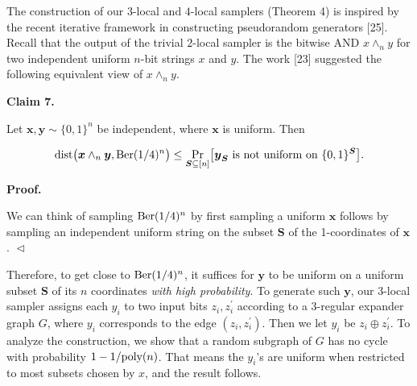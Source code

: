 \documentclass[10pt,a4paper]{article}
\begin{document}
The construction of our $3$-local and $4$-local samplers (Theorem 4) is inspired by the recent iterative framework in constructing pseudorandom generators [25].
Recall that the output of the trivial $2$-local sampler is the bitwise AND $x\wedge_{n}y$ for two independent uniform $n$-bit strings $x$ and $y$.
The work [23] suggested the following equivalent view of $x\wedge_{n}y$.\par





\par\medskip\noindent\textbf{
Claim 7. 
}\par



Let $\boldsymbol{x},\boldsymbol{y}\sim\{0,1\}^{n}$ be independent, where $\boldsymbol{x}$ is uniform.
Then\par


\[\begin{gathered}
\mathrm{dist}\bigl(\boldsymbol{x}\wedge_{n}\boldsymbol{y},\textnormal{Ber}(1/4)^{n}\bigr)\leq\Pr_{\boldsymbol{S}\subseteq[n]}\bigl[\text{$\boldsymbol{y}_{\boldsymbol{S}}$ is not uniform on $\{0,1\}^{\boldsymbol{S}}$}\bigr].
\end{gathered}\]






\par\medskip\noindent\textbf{
\textbf{Proof}.}\par




We can think of sampling $\textnormal{Ber}(1/4)^{n}$ by first sampling a uniform $\boldsymbol{x}$ follows by sampling an independent uniform string on the subset $\boldsymbol{S}$ of the 1-coordinates of $\boldsymbol{x}$.
$\vartriangleleft$\par




Therefore, to get close to $\textnormal{Ber}(1/4)^{n}$, it suffices for $\boldsymbol{y}$ to be uniform on a uniform subset $\boldsymbol{S}$ of its $n$ coordinates \emph{with high probability}.
To generate such $\boldsymbol{y}$, our 3-local sampler assigns each $y_{i}$ to two input bits $z_{i},z_{i}^{\prime}$ according to a 3-regular expander graph $G$, where $y_{i}$ corresponds to the edge $(z_{i},z_{i}^{\prime})$.
Then we let $y_{i}$ be $z_{i}\oplus z_{i}^{\prime}$.
To analyze the construction, we show that a random subgraph of $G$ has no cycle with probability $1-1/\textnormal{poly}(n)$.
That means the $y_{i}$’s are uniform when restricted to most subsets chosen by $x$, and the result follows.\par
\end{document}
